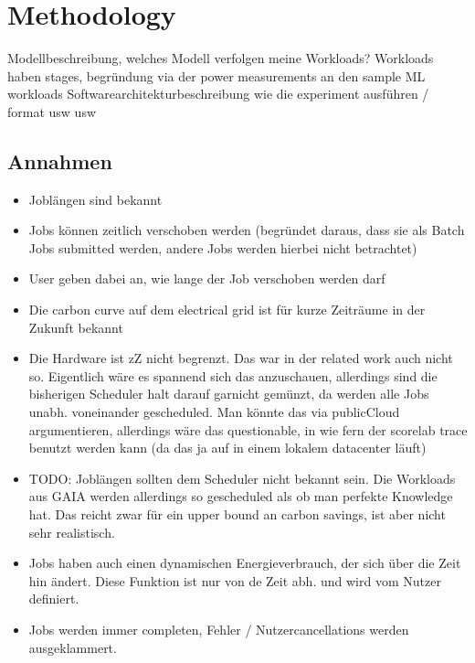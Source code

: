 \chapter{Methodology}

Modellbeschreibung, welches Modell verfolgen meine Workloads?
Workloads haben stages, begründung via der power measurements an den sample ML workloads
Softwarearchitekturbeschreibung
wie die experiment ausführen / format usw usw

\section{Annahmen}

\begin{itemize}
    \item Joblängen sind bekannt
    \item Jobs können zeitlich verschoben werden (begründet daraus, dass sie als Batch Jobs submitted werden, andere Jobs werden hierbei nicht betrachtet)
    \item User geben dabei an, wie lange der Job verschoben werden darf
    \item Die carbon curve auf dem electrical grid ist für kurze Zeiträume in der Zukunft bekannt
    \item Die Hardware ist zZ nicht begrenzt. Das war in der related work auch nicht so. Eigentlich wäre es spannend sich das anzuschauen, allerdings sind die bisherigen Scheduler halt darauf garnicht gemünzt, da werden alle Jobs unabh. voneinander gescheduled. Man könnte das via publicCloud argumentieren, allerdings wäre das questionable, in wie fern der scorelab trace benutzt werden kann (da das ja auf in einem lokalem datacenter läuft)
    \item TODO: Joblängen sollten dem Scheduler nicht bekannt sein. Die Workloads aus GAIA werden allerdings so gescheduled als ob man perfekte Knowledge hat. Das reicht zwar für ein upper bound an carbon savings, ist aber nicht sehr realistisch.  
    \item Jobs haben auch einen dynamischen Energieverbrauch, der sich über die Zeit hin ändert. Diese Funktion ist nur von de Zeit abh. und wird vom Nutzer definiert.
    \item Jobs werden immer completen, Fehler / Nutzercancellations werden ausgeklammert.
\end{itemize}